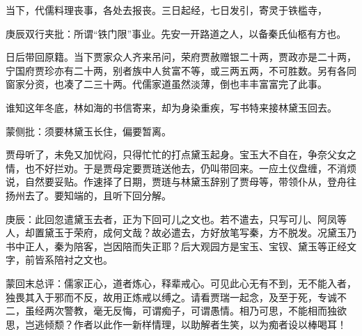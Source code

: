 \begin{parag}


    当下，代儒料理丧事，各处去报丧。三日起经，七日发引，寄灵于铁槛寺，\begin{note}庚辰双行夹批：所谓“铁门限”事业。先安一开路道之人，以备秦氏仙柩有方也。\end{note}日后带回原籍。当下贾家众人齐来吊问，荣府贾赦赠银二十两，贾政亦是二十两，宁国府贾珍亦有二十两，别者族中人贫富不等，或三两五两，不可胜数。另有各同窗家分资，也凑了二三十两。代儒家道虽然淡薄，倒也丰丰富富完了此事。
\end{parag}


\begin{parag}


    谁知这年冬底，林如海的书信寄来，却为身染重疾，写书特来接林黛玉回去。\begin{note}蒙侧批：须要林黛玉长住，偏要暂离。\end{note}贾母听了，未免又加忧闷，只得忙忙的打点黛玉起身。宝玉大不自在，争奈父女之情，也不好拦劝。于是贾母定要贾琏送他去，仍叫带回来。一应土仪盘缠，不消烦说，自然要妥贴。作速择了日期，贾琏与林黛玉辞别了贾母等，带领仆从，登舟往扬州去了。要知端的，且听下回分解。
\end{parag}

\begin{parag}

    \begin{note}庚辰：此回忽遣黛玉去者，正为下回可儿之文也。若不遣去，只写可儿、阿凤等人，却置黛玉于荣府，成何文哉？故必遣去，方好放笔写秦，方不脱发。况黛玉乃书中正人，秦为陪客，岂因陪而失正耶？后大观园方是宝玉、宝钗、黛玉等正经文字，前皆系陪衬之文也。\end{note}
\end{parag}


\begin{parag}


    \begin{note}蒙回末总评：儒家正心，道者炼心，释辈戒心。可见此心无有不到，无不能入者，独畏其入于邪而不反，故用正炼戒以缚之。请看贾瑞一起念，及至于死，专诚不二，虽经两次警教，毫无反悔，可谓痴子，可谓愚情。相乃可思，不能相而独欲思，岂逃倾颓？作者以此作一新样情理，以助解者生笑，以为痴者设以棒喝耳！\end{note}
\end{parag}